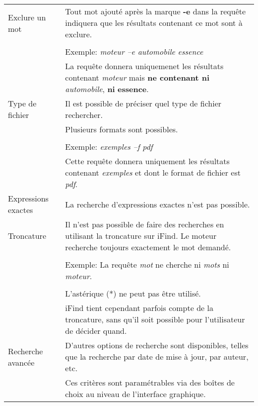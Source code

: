 \begin{longtable}{| p{5cm} | p{8cm} |}
\hline
Exclure un mot & Tout mot ajouté après la marque \textbf{-e} dans la requête 
indiquera que les résultats contenant ce mot sont à exclure.\\
& \\
& Exemple: \textit{moteur –e automobile essence}\\
& La requête donnera uniquemenet les résultats contenant \textit{moteur} mais 
\textbf{ne contenant ni} \textit{automobile}, \textbf{ni} \textbf{essence}.\\

\hline
Type de fichier & Il est possible de préciser quel type de fichier rechercher.\\
& Plusieurs formats sont possibles.\\
& \\
& Exemple: \textit{exemples –f pdf}\\
& Cette requête donnera uniquement les résultats contenant \textit{exemples} et
dont le format de fichier est \textit{pdf}.\\

\hline
Expressions exactes & La recherche d'expressions exactes n'est pas possible.\\

\hline
Troncature & Il n'est pas possible de faire des recherches en utilisant la
troncature sur iFind. Le moteur recherche toujours exactement le mot demandé.\\
& \\
& Exemple: La requête \textit{mot} ne cherche ni \textit{mots} ni \textit{moteur}.\\
& \\
& L'astérique (*) ne peut pas être utilisé.\\
& iFind tient cependant parfois compte de la troncature, sans qu'il soit possible
pour l'utilisateur de décider quand.\\

\hline
Recherche avancée & D'autres options de recherche sont disponibles, telles que la 
recherche par date de mise à jour, par auteur, etc.\\
& Ces critères sont paramétrables via des boîtes de choix au niveau de l’interface graphique.\\
\hline

\end{longtable}
